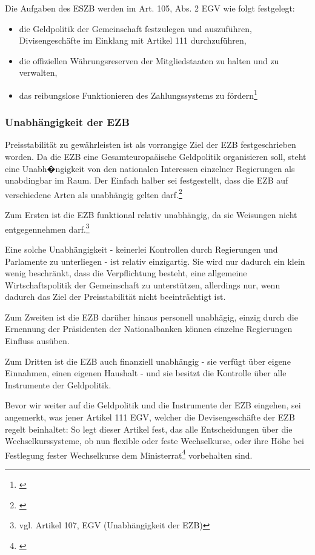 \documentclass[
        onecolumn,
        a4paper,
        abstracton,
        parskip=half
        ,final
        ]{scrartcl}
\begin{document}
Die Aufgaben des ESZB werden im Art. 105, Abs. 2 EGV wie folgt festgelegt:
\begin{itemize}
 \item{die Geldpolitik der Gemeinschaft festzulegen und auszuf{\"u}hren, Divisengesch{\"a}fte im Einklang mit Artikel 111 durchzuf{\"u}hren,}
 \item{die offiziellen W{\"a}hrungsreserven der Mitgliedstaaten zu halten und zu verwalten,}
 \item{das reibungslose Funktionieren des Zahlungssystems zu f{\"o}rdern}\footnote[50]{\citep[vgl.][S.555]{Basseler2010}}
\end{itemize}

\subsubsection{Unabh{\"a}ngigkeit der EZB}  %

Preisstabilit{\"a}t zu gew{\"a}hrleisten ist als vorrangige Ziel der EZB festgeschrieben worden. Da die EZB eine Gesamteuropa{\"a}ische Geldpolitik organisieren soll, steht eine Unabh�ngigkeit von den nationalen Interessen einzelner Regierungen als unabdingbar im Raum. Der Einfach halber sei festgestellt, dass die EZB auf verschiedene Arten als unabh{\"a}ngig gelten darf.\footnote[51]{\citep[vgl.][S.555-557]{Basseler2010}}

Zum Ersten ist die EZB funktional relativ unabh{\"a}ngig, da sie Weisungen nicht entgegennehmen darf.\footnote[34]{vgl. Artikel 107, EGV (Unabh{\"a}ngigkeit der EZB)}

Eine solche Unabh{\"a}ngigkeit - keinerlei Kontrollen durch Regierungen und Parlamente zu unterliegen - ist relativ einzigartig. Sie wird nur dadurch ein klein wenig beschr{\"a}nkt, dass die Verpflichtung besteht, eine allgemeine Wirtschaftspolitik der Gemeinschaft zu unterst{\"u}tzen, allerdings nur, wenn dadurch das Ziel der Preisstabilit{\"a}t nicht beeintr{\"a}chtigt ist.

Zum Zweiten ist die EZB dar{\"u}her hinaus personell unabh{\"a}gig, einzig durch die Ernennung der Pr{\"a}sidenten der Nationalbanken k{\"o}nnen einzelne Regierungen Einfluss aus{\"u}ben.

Zum Dritten ist die EZB auch finanziell unabh{\"a}ngig - sie verf{\"u}gt {\"u}ber eigene Einnahmen, einen eigenen Haushalt - und sie besitzt die Kontrolle {\"u}ber alle Instrumente der Geldpolitik.

Bevor wir weiter auf die Geldpolitik und die Instrumente der EZB eingehen, sei angemerkt, was jener Artikel 111 EGV, welcher die Devisengesch{\"a}fte der EZB regelt beinhaltet:
So legt dieser Artikel fest, das alle Entscheidungen {\"u}ber die Wechselkurssysteme, ob nun flexible oder feste Wechselkurse, oder ihre H{\"o}he bei Festlegung fester Wechselkurse dem Ministerrat\footnote[52]{\citep[S.555]{Basseler2010}} vorbehalten sind.
\end{document}
